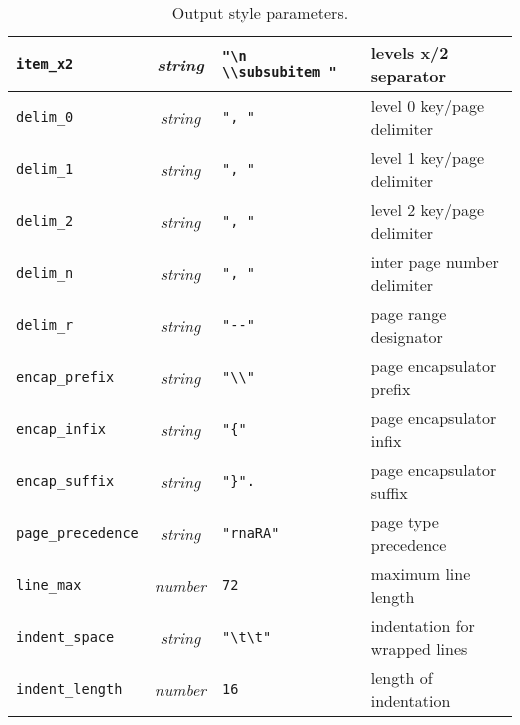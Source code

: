 \begin{table}
\begin{center}
{\begin{tabular}{l|c|l|l}
\verb|item_x2| &  {\it string\/} & \verb|"\n      \\subsubitem "| &
levels x/2 separator\\
\hline
\verb|delim_0| &  {\it string\/} & \verb|", "| &
level 0 key/page delimiter\\
\hline
\verb|delim_1| &  {\it string\/} & \verb|", "| &
level 1 key/page delimiter\\
\hline
\verb|delim_2| &  {\it string\/} & \verb|", "| &
level 2 key/page delimiter\\
\hline
\verb|delim_n| &  {\it string\/} & \verb|", "| &
inter page number delimiter\\
\hline
\verb|delim_r| &  {\it string\/} & \verb|"--"| &
page range designator\\
\hline
\verb|encap_prefix| &  {\it string\/} & \verb|"\\"| &
page encapsulator prefix\\
\hline
\verb|encap_infix| &  {\it string\/} & \verb|"{"| &
page encapsulator infix\\
\hline
\verb|encap_suffix| &  {\it string\/} & \verb|"}".| &
page encapsulator suffix\\
\hline
\verb|page_precedence| &  {\it string\/} & \verb|"rnaRA"| &
page type precedence\\
\hline
\verb|line_max| &  {\it number\/} & \verb|72| &
maximum line length\\
\hline
\verb|indent_space| &  {\it string\/} & \verb|"\t\t"| &
indentation for wrapped lines\\
\hline
\verb|indent_length| &  {\it number\/} & \verb|16| &
length of indentation\\
\hline
\end{tabular}
}
\end{center}
\caption{Output style parameters.}
\label{tbl:outputformat}
\end{table}

